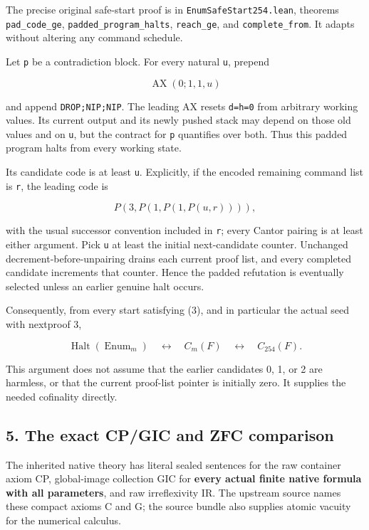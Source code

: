 The precise original safe-start proof is in
\texttt{EnumSafeStart254.lean}, theorems \texttt{pad\_code\_ge},
\texttt{padded\_program\_halts}, \texttt{reach\_ge}, and
\texttt{complete\_from}. It adapts without altering any command
schedule.

Let \texttt{p} be a contradiction block. For every natural \texttt{u},
prepend

\[
\operatorname{AX}(0;1,1,u)
\]

and append \texttt{DROP;NIP;NIP}. The leading AX resets \texttt{d=h=0}
from arbitrary working values. Its current output and its newly pushed
stack may depend on those old values and on \texttt{u}, but the contract
for \texttt{p} quantifies over both. Thus this padded program halts from
every working state.

Its candidate code is at least \texttt{u}. Explicitly, if the encoded
remaining command list is \texttt{r}, the leading code is

\[
P(3,P(1,P(1,P(u,r)))),
\]

with the usual successor convention included in \texttt{r}; every Cantor
pairing is at least either argument. Pick \texttt{u} at least the
initial next-candidate counter. Unchanged decrement-before-unpairing
drains each current proof list, and every completed candidate increments
that counter. Hence the padded refutation is eventually selected unless
an earlier genuine halt occurs.

Consequently, from every start satisfying (3), and in particular the
actual seed with nextproof 3,

\[
\operatorname{Halt}(\operatorname{Enum}_m)\quad\longleftrightarrow\quad C_m(F)
\quad\longleftrightarrow\quad C_{254}(F).
\tag{4}
\]

This argument does not assume that the earlier candidates 0, 1, or 2 are
harmless, or that the current proof-list pointer is initially zero. It
supplies the needed cofinality directly.

\hypertarget{the-exact-cpgic-and-zfc-comparison}{%
\subsection{5. The exact CP/GIC and ZFC
comparison}\label{the-exact-cpgic-and-zfc-comparison}}

The inherited native theory has literal sealed sentences for the raw
container axiom CP, global-image collection GIC for \textbf{every actual
finite native formula with all parameters}, and raw irreflexivity IR.
The upstream source names these compact axioms C and G; the source
bundle also supplies atomic vacuity for the numerical calculus.

